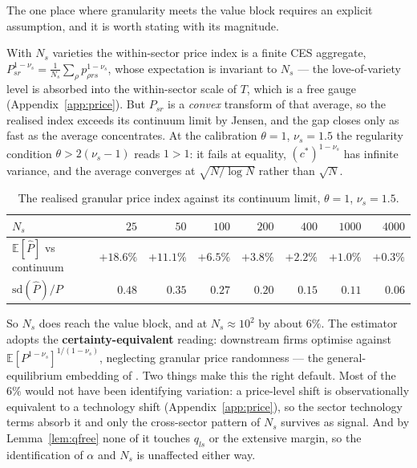 \documentclass[11pt]{article}
\newcommand{\E}{\mathbb{E}}
\begin{document}
The one place where granularity meets the value block requires an explicit assumption, and it is
worth stating with its magnitude.

With $N_{s}$ varieties the within-sector price index is a finite CES aggregate,
$P_{sr}^{1-\nu_{s}}=\frac{1}{N_{s}}\sum_{\rho}p_{\rho rs}^{1-\nu_{s}}$, whose expectation is
invariant to $N_{s}$ --- the love-of-variety level is absorbed into the within-sector scale of $T$,
which is a free gauge (Appendix~\ref{app:price}). But $P_{sr}$ is a \emph{convex} transform of that
average, so the realised index exceeds its continuum limit by Jensen, and the gap closes only as
fast as the average concentrates. At the calibration $\theta=1$, $\nu_{s}=1.5$ the regularity
condition $\theta>2(\nu_{s}-1)$ reads $1>1$: it fails at equality, $(c^{*})^{1-\nu_{s}}$ has
infinite variance, and the average converges at $\sqrt{N/\log N}$ rather than $\sqrt{N}$.

\begin{table}[htbp]
\centering
\small
\begin{tabular}{@{}lrrrrrrr@{}}
\toprule
$N_{s}$ & $25$ & $50$ & $100$ & $200$ & $400$ & $1000$ & $4000$\\
\midrule
$\E[\widehat P]$ vs continuum & $+18.6\%$ & $+11.1\%$ & $+6.5\%$ & $+3.8\%$ & $+2.2\%$ & $+1.0\%$ & $+0.3\%$\\
$\mathrm{sd}(\widehat P)/P$ & $0.48$ & $0.35$ & $0.27$ & $0.20$ & $0.15$ & $0.11$ & $0.06$\\
\bottomrule
\end{tabular}
\caption{The realised granular price index against its continuum limit, $\theta=1$, $\nu_{s}=1.5$.}
\label{tab:price-jensen}
\end{table}

So $N_{s}$ does reach the value block, and at $N_{s}\approx10^{2}$ by about $6\%$. The estimator
adopts the \textbf{certainty-equivalent} reading: downstream firms optimise against
$\E[P^{1-\nu_{s}}]^{1/(1-\nu_{s})}$, neglecting granular price randomness --- the
general-equilibrium embedding of \citet{lmm2023}. Two things make this the right default. Most of
the $6\%$ would not have been identifying variation: a price-level shift is observationally
equivalent to a technology shift (Appendix~\ref{app:price}), so the sector technology terms absorb
it and only the cross-sector pattern of $N_{s}$ survives as signal. And by Lemma~\ref{lem:qfree}
none of it touches $q_{ls}$ or the extensive margin, so the identification of $\alpha$ and $N_{s}$
is unaffected either way.
\end{document}
